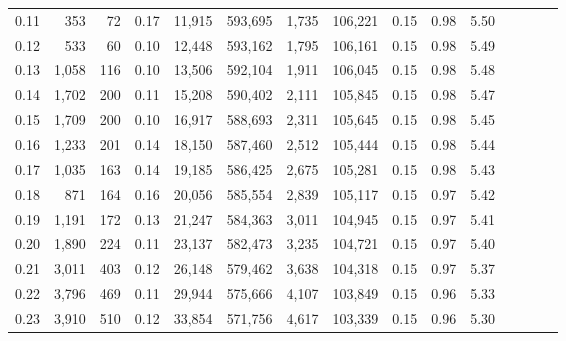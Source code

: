 \begin{tabular}{rrrcrrrrrrrrrrr}
0.11 &     353 &      72 &                                       0.17 &   11,915 &  593,695 &    1,735 &  106,221 &  0.15 &  0.98 &                         5.50 \\
0.12 &     533 &      60 &                                       0.10 &   12,448 &  593,162 &    1,795 &  106,161 &  0.15 &  0.98 &                         5.49 \\
0.13 &   1,058 &     116 &                                       0.10 &   13,506 &  592,104 &    1,911 &  106,045 &  0.15 &  0.98 &                         5.48 \\
0.14 &   1,702 &     200 &                                       0.11 &   15,208 &  590,402 &    2,111 &  105,845 &  0.15 &  0.98 &                         5.47 \\
0.15 &   1,709 &     200 &                                       0.10 &   16,917 &  588,693 &    2,311 &  105,645 &  0.15 &  0.98 &                         5.45 \\
0.16 &   1,233 &     201 &                                       0.14 &   18,150 &  587,460 &    2,512 &  105,444 &  0.15 &  0.98 &                         5.44 \\
0.17 &   1,035 &     163 &                                       0.14 &   19,185 &  586,425 &    2,675 &  105,281 &  0.15 &  0.98 &                         5.43 \\
0.18 &     871 &     164 &                                       0.16 &   20,056 &  585,554 &    2,839 &  105,117 &  0.15 &  0.97 &                         5.42 \\
0.19 &   1,191 &     172 &                                       0.13 &   21,247 &  584,363 &    3,011 &  104,945 &  0.15 &  0.97 &                         5.41 \\
0.20 &   1,890 &     224 &                                       0.11 &   23,137 &  582,473 &    3,235 &  104,721 &  0.15 &  0.97 &                         5.40 \\
0.21 &   3,011 &     403 &                                       0.12 &   26,148 &  579,462 &    3,638 &  104,318 &  0.15 &  0.97 &                         5.37 \\
0.22 &   3,796 &     469 &                                       0.11 &   29,944 &  575,666 &    4,107 &  103,849 &  0.15 &  0.96 &                         5.33 \\
0.23 &   3,910 &     510 &                                       0.12 &   33,854 &  571,756 &    4,617 &  103,339 &  0.15 &  0.96 &                         5.30 \\

\end{tabular}
